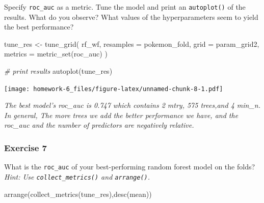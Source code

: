 \documentclass[
]{article}
\newenvironment{Shaded}{\begin{snugshade}}{\end{snugshade}}
\newcommand{\AttributeTok}[1]{\textcolor[rgb]{0.77,0.63,0.00}{#1}}
\newcommand{\CommentTok}[1]{\textcolor[rgb]{0.56,0.35,0.01}{\textit{#1}}}
\newcommand{\FunctionTok}[1]{\textcolor[rgb]{0.00,0.00,0.00}{#1}}
\newcommand{\NormalTok}[1]{#1}
\newcommand{\OtherTok}[1]{\textcolor[rgb]{0.56,0.35,0.01}{#1}}
\begin{document}
Specify \texttt{roc\_auc} as a metric. Tune the model and print an
\texttt{autoplot()} of the results. What do you observe? What values of
the hyperparameters seem to yield the best performance?

\begin{Shaded}
\begin{Highlighting}[]
\NormalTok{tune\_res }\OtherTok{\textless{}{-}} \FunctionTok{tune\_grid}\NormalTok{(}
\NormalTok{  rf\_wf, }
  \AttributeTok{resamples =}\NormalTok{ pokemon\_fold, }
  \AttributeTok{grid =}\NormalTok{ param\_grid2, }
  \AttributeTok{metrics =} \FunctionTok{metric\_set}\NormalTok{(roc\_auc)}
\NormalTok{)}

\CommentTok{\# print results}
\FunctionTok{autoplot}\NormalTok{(tune\_res)}
\end{Highlighting}
\end{Shaded}

\texttt{[image: homework-6\_files/figure-latex/unnamed-chunk-8-1.pdf]}

\hfill\break
\emph{The best model's roc\_auc is 0.747 which contains 2 mtry, 575
trees,and 4 min\_n.}\\
\emph{In general, The more trees we add the better performance we have,
and the roc\_auc and the number of predictors are negatively relative.}

\hypertarget{exercise-7}{%
\subsubsection{Exercise 7}\label{exercise-7}}

What is the \texttt{roc\_auc} of your best-performing random forest
model on the folds? \emph{Hint: Use \texttt{collect\_metrics()} and
\texttt{arrange()}.}

\begin{Shaded}
\begin{Highlighting}[]
\FunctionTok{arrange}\NormalTok{(}\FunctionTok{collect\_metrics}\NormalTok{(tune\_res),}\FunctionTok{desc}\NormalTok{(mean))}
\end{Highlighting}
\end{Shaded}
\end{document}
